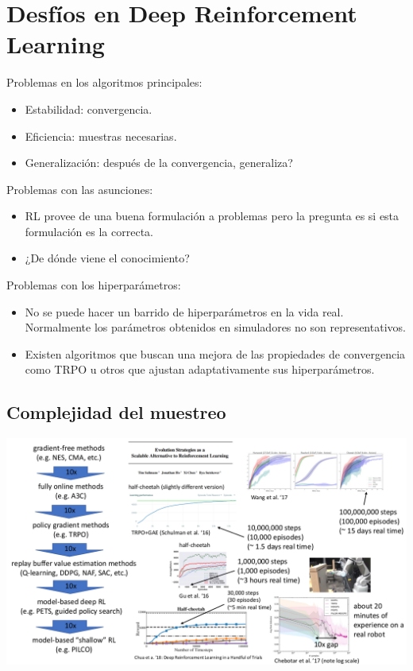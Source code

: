 
\section{Desfíos en Deep Reinforcement Learning}%
\label{sec:desfíos_en_deep_reinforcement_learning}

Problemas en los algoritmos principales:
\begin{itemize}
    \item Estabilidad: convergencia. 
    \item Eficiencia: muestras necesarias.
    \item Generalización: después de la convergencia, generaliza?
\end{itemize}

Problemas con las asunciones:
\begin{itemize}
    \item RL provee de una buena formulación a problemas pero la pregunta es si esta formulación
        es la correcta.
    \item ¿De dónde viene el conocimiento?
\end{itemize}

Problemas con los hiperparámetros:
\begin{itemize}
    \item No se puede hacer un barrido de hiperparámetros en la vida real. Normalmente los
        parámetros obtenidos en simuladores no son representativos.
    \item Existen algoritmos que buscan una mejora de las propiedades de convergencia como
        TRPO u otros que ajustan adaptativamente sus hiperparámetros.
\end{itemize}

\subsection{Complejidad del muestreo}%
\label{sub:complejidad_del_muestreo}

\begin{center}
\includegraphics[width=.8\textwidth]{figures/2020-08-07-161110_1193x674_scrot.png}
\end{center}

